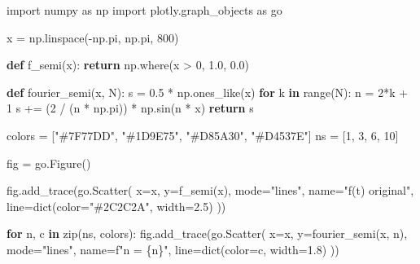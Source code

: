 \documentclass[
  letterpaper,
  DIV=11,
  numbers=noendperiod]{scrreprt}
\newenvironment{Shaded}{\begin{snugshade}}{\end{snugshade}}
\newcommand{\BuiltInTok}[1]{\textcolor[rgb]{0.00,0.23,0.31}{#1}}
\newcommand{\ControlFlowTok}[1]{\textcolor[rgb]{0.00,0.23,0.31}{\textbf{#1}}}
\newcommand{\DecValTok}[1]{\textcolor[rgb]{0.68,0.00,0.00}{#1}}
\newcommand{\FloatTok}[1]{\textcolor[rgb]{0.68,0.00,0.00}{#1}}
\newcommand{\ImportTok}[1]{\textcolor[rgb]{0.00,0.46,0.62}{#1}}
\newcommand{\KeywordTok}[1]{\textcolor[rgb]{0.00,0.23,0.31}{\textbf{#1}}}
\newcommand{\NormalTok}[1]{\textcolor[rgb]{0.00,0.23,0.31}{#1}}
\newcommand{\OperatorTok}[1]{\textcolor[rgb]{0.37,0.37,0.37}{#1}}
\newcommand{\SpecialCharTok}[1]{\textcolor[rgb]{0.37,0.37,0.37}{#1}}
\newcommand{\SpecialStringTok}[1]{\textcolor[rgb]{0.13,0.47,0.30}{#1}}
\newcommand{\StringTok}[1]{\textcolor[rgb]{0.13,0.47,0.30}{#1}}
\begin{document}
\begin{Shaded}
\begin{Highlighting}[]
\ImportTok{import}\NormalTok{ numpy }\ImportTok{as}\NormalTok{ np}
\ImportTok{import}\NormalTok{ plotly.graph\_objects }\ImportTok{as}\NormalTok{ go}

\NormalTok{x }\OperatorTok{=}\NormalTok{ np.linspace(}\OperatorTok{{-}}\NormalTok{np.pi, np.pi, }\DecValTok{800}\NormalTok{)}

\KeywordTok{def}\NormalTok{ f\_semi(x):}
    \ControlFlowTok{return}\NormalTok{ np.where(x }\OperatorTok{\textgreater{}} \DecValTok{0}\NormalTok{, }\FloatTok{1.0}\NormalTok{, }\FloatTok{0.0}\NormalTok{)}

\KeywordTok{def}\NormalTok{ fourier\_semi(x, N):}
\NormalTok{    s }\OperatorTok{=} \FloatTok{0.5} \OperatorTok{*}\NormalTok{ np.ones\_like(x)}
    \ControlFlowTok{for}\NormalTok{ k }\KeywordTok{in} \BuiltInTok{range}\NormalTok{(N):}
\NormalTok{        n }\OperatorTok{=} \DecValTok{2}\OperatorTok{*}\NormalTok{k }\OperatorTok{+} \DecValTok{1}
\NormalTok{        s }\OperatorTok{+=}\NormalTok{ (}\DecValTok{2} \OperatorTok{/}\NormalTok{ (n }\OperatorTok{*}\NormalTok{ np.pi)) }\OperatorTok{*}\NormalTok{ np.sin(n }\OperatorTok{*}\NormalTok{ x)}
    \ControlFlowTok{return}\NormalTok{ s}

\NormalTok{colors }\OperatorTok{=}\NormalTok{ [}\StringTok{"\#7F77DD"}\NormalTok{, }\StringTok{"\#1D9E75"}\NormalTok{, }\StringTok{"\#D85A30"}\NormalTok{, }\StringTok{"\#D4537E"}\NormalTok{]}
\NormalTok{ns     }\OperatorTok{=}\NormalTok{ [}\DecValTok{1}\NormalTok{, }\DecValTok{3}\NormalTok{, }\DecValTok{6}\NormalTok{, }\DecValTok{10}\NormalTok{]}

\NormalTok{fig }\OperatorTok{=}\NormalTok{ go.Figure()}

\NormalTok{fig.add\_trace(go.Scatter(}
\NormalTok{    x}\OperatorTok{=}\NormalTok{x, y}\OperatorTok{=}\NormalTok{f\_semi(x),}
\NormalTok{    mode}\OperatorTok{=}\StringTok{"lines"}\NormalTok{, name}\OperatorTok{=}\StringTok{"f(t) original"}\NormalTok{,}
\NormalTok{    line}\OperatorTok{=}\BuiltInTok{dict}\NormalTok{(color}\OperatorTok{=}\StringTok{"\#2C2C2A"}\NormalTok{, width}\OperatorTok{=}\FloatTok{2.5}\NormalTok{)}
\NormalTok{))}

\ControlFlowTok{for}\NormalTok{ n, c }\KeywordTok{in} \BuiltInTok{zip}\NormalTok{(ns, colors):}
\NormalTok{    fig.add\_trace(go.Scatter(}
\NormalTok{        x}\OperatorTok{=}\NormalTok{x, y}\OperatorTok{=}\NormalTok{fourier\_semi(x, n),}
\NormalTok{        mode}\OperatorTok{=}\StringTok{"lines"}\NormalTok{, name}\OperatorTok{=}\SpecialStringTok{f"n = }\SpecialCharTok{\{}\NormalTok{n}\SpecialCharTok{\}}\SpecialStringTok{"}\NormalTok{,}
\NormalTok{        line}\OperatorTok{=}\BuiltInTok{dict}\NormalTok{(color}\OperatorTok{=}\NormalTok{c, width}\OperatorTok{=}\FloatTok{1.8}\NormalTok{)}
\NormalTok{    ))}


\end{Highlighting}
\end{Shaded}
\end{document}
